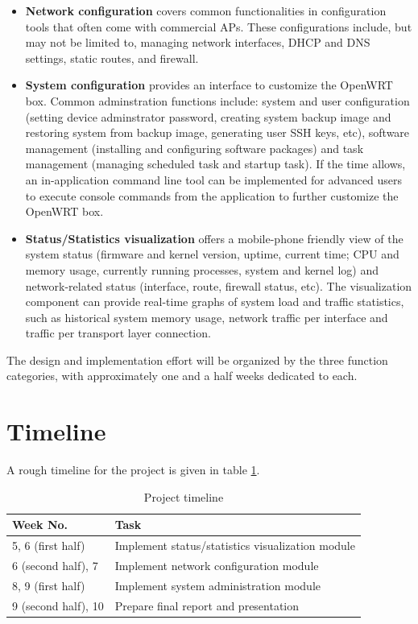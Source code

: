 \documentclass{sig-alternate-05-2015}
\begin{document}
	\begin{itemize}
		
		\item
		\textbf{Network configuration} covers common functionalities in configuration tools that often come with commercial APs. These configurations include, but may not be limited to, managing network interfaces, DHCP and DNS settings, static routes, and firewall.
		
		\item
		\textbf{System configuration} provides an interface to customize the OpenWRT box. Common adminstration functions include: system and user configuration (setting device adminstrator password, creating system backup image and restoring system from backup image, generating user SSH keys, etc), software management (installing and configuring software packages) and task management (managing scheduled task and startup task). If the time allows, an in-application command line tool can be implemented for advanced users to execute console commands from the application to further customize the OpenWRT box.
		
		\item
		\textbf{Status/Statistics visualization} offers a mobile-phone friendly view of the system status (firmware and kernel version, uptime, current time; CPU and memory usage, currently running processes, system and kernel log) and network-related status (interface, route, firewall status, etc). The visualization component can provide real-time graphs of system load and traffic statistics, such as historical system memory usage, network traffic per interface and traffic per transport layer connection.
		
	\end{itemize}
	
	The design and implementation effort will be organized by the three function categories, with approximately one and a half weeks dedicated to each.
	
	\section{Timeline}
	
	A rough timeline for the project is given in table \ref{table:timeline}.
	
	\begin{table}[h]
		\centering
		\caption{Project timeline}
		\label{table:timeline}
		\begin{tabular}{p{3cm}|p{5cm}} \hline
			Week No. & Task \\ \hline
			5, 6 (first half) & Implement status/statistics visualization module \\ \hline
			6 (second half), 7 & Implement network configuration module \\ \hline
			8, 9 (first half) & Implement system administration module \\ \hline
			9 (second half), 10 & Prepare final report and presentation \\
			\hline\end{tabular}
	\end{table}
	
  
  
\end{document}
